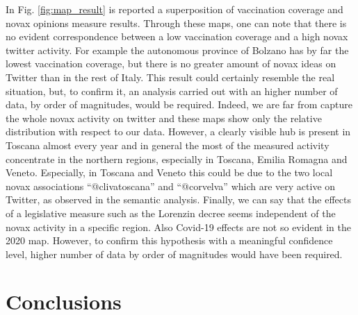 \documentclass[prb,twocolumn,9pt]{revtex4-1}
\begin{document}
In Fig. \ref{fig:map_result} is reported a superposition of vaccination coverage and novax opinions measure results. Through these maps, one can note that there is no evident correspondence between a low vaccination coverage and a high novax twitter activity. For example the autonomous province of Bolzano has by far the lowest vaccination coverage, but there is no greater amount of novax ideas on Twitter than in the rest of Italy. This result could certainly resemble the real situation, but, to confirm it, an analysis carried out with an higher number of data, by order of magnitudes, would be required. Indeed, we are far from capture the whole novax activity on twitter and these maps show only the relative distribution with respect to our data. However, a clearly visible hub is present in Toscana almost every year and in general the most of the measured activity concentrate in the northern regions, especially in Toscana, Emilia Romagna and Veneto. Especially, in Toscana and Veneto this could be due to the two local novax associations “@clivatoscana” and “@corvelva” which are very active on Twitter, as observed in the semantic analysis. Finally, we can say that the effects of a legislative measure such as the Lorenzin decree seems independent of the novax activity in a specific region. Also Covid-19 effects are not so evident in the 2020 map. However, to confirm this hypothesis with a meaningful confidence level, higher number of data by order of magnitudes would have been required.




\section{Conclusions}
\label{sec:conclusions}
\end{document}
